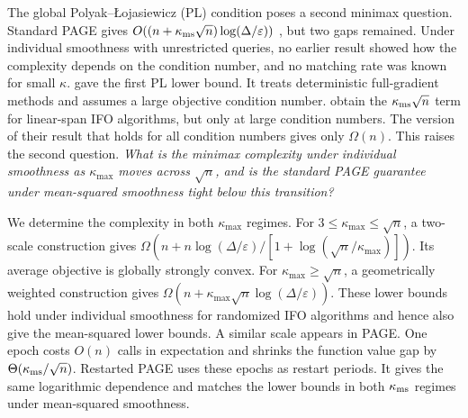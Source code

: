 \documentclass{article}
\theoremstyle{definition}
\begin{document}
The global Polyak--\L{}ojasiewicz (PL) condition poses a second minimax
question.  Standard PAGE gives
$O((n+\kappa_{\rm ms}\sqrt n)\log(\Delta/\varepsilon))$
\citep[Corollary~6]{li2021page}, but two gaps remained.  Under individual
smoothness with unrestricted queries, no earlier result showed how the
complexity depends on the condition number, and no matching rate was known for
small $\kappa$.  \citet{yue2023lower} gave the first PL lower
bound.  It treats deterministic full-gradient methods and assumes a large
objective condition number.  \citet{bai2024complexity} obtain the
$\kappa_{\rm ms}\sqrt n$ term for linear-span IFO algorithms, but only at large
condition numbers.  The version of their result that holds for all condition
numbers gives only $\Omega(n)$.  This raises the second question.  \emph{What
is the minimax complexity under individual smoothness as $\kappa_{\max}$ moves
across $\sqrt n$, and is the standard PAGE guarantee under mean-squared
smoothness tight below this transition?}

We determine the complexity in both $\kappa_{\max}$ regimes.  For
$3\le\kappa_{\max}\le\sqrt n$, a two-scale construction gives
$\Omega(n+n\log(\Delta/\varepsilon)/
[1+\log(\sqrt n/\kappa_{\max})])$.  Its average objective is globally strongly
convex.  For $\kappa_{\max}\ge\sqrt n$, a geometrically weighted construction
gives
$\Omega(n+\kappa_{\max}\sqrt n\log(\Delta/\varepsilon))$.
These lower bounds hold under individual smoothness for randomized IFO
algorithms and hence also give the mean-squared lower bounds.  A similar scale
appears in PAGE.  One epoch costs $O(n)$ calls in expectation and shrinks the
function value gap by $\Theta(\kappa_{\rm ms}/\sqrt n)$.
Restarted PAGE uses these epochs as restart periods.  It gives the same
logarithmic dependence and matches the lower bounds in both $\kappa_{\rm ms}$
regimes under mean-squared smoothness.
\end{document}
